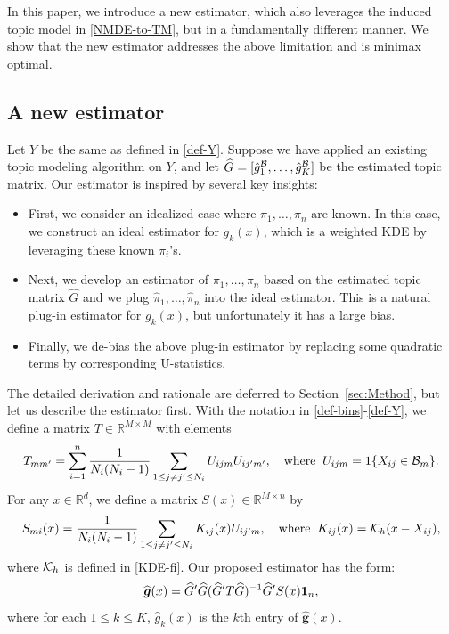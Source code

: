 \documentclass[preprint,11pt]{article}
\numberwithin{equation}{section}
\newcommand{\beq}{\begin{equation}}
\newcommand{\eeq}{\end{equation}}
\begin{document}
In this paper, we introduce a new estimator, which also leverages the induced topic model in \eqref{NMDE-to-TM}, but in a fundamentally different manner. We show that the new estimator addresses the above limitation and is minimax optimal. 



\subsection{A new estimator} \label{subsec:our-method}
Let $Y$ be the same as defined in \eqref{def-Y}. Suppose we have applied an existing topic modeling algorithm on $Y$, and let $\widehat{G}=[\hat{g}_1^{\cal B}, \ldots, \hat{g}_K^{\cal B}]$ be the estimated topic matrix. 
Our estimator is inspired by several key insights:
\begin{itemize}
	\item First, we consider an idealized case where $\pi_1, \ldots, \pi_n$ are known. In this case, we construct an ideal estimator for $g_k(x)$, which is a weighted KDE by leveraging these known $\pi_i$'s.
	\item Next, we develop an estimator of $\pi_1, \ldots, \pi_n$ based on %
	the estimated topic matrix $\widehat{G}$ and  we plug $\hat{\pi}_1, \ldots, \hat{\pi}_n$ into the ideal estimator. This is a natural plug-in estimator for $g_k(x)$, but unfortunately it has a large bias. 
	\item Finally, we de-bias the above plug-in estimator by replacing some quadratic terms by corresponding U-statistics. %
\end{itemize}
The detailed derivation and rationale are deferred to Section~\ref{sec:Method}, but let us describe the estimator first.
With the notation in \eqref{def-bins}-\eqref{def-Y},  we define a matrix $T\in\mathbb{R}^{M\times M}$ with elements
\beq \label{def-T-U}
T_{mm'} =  \sum_{i=1}^n \frac{1}{N_i(N_i-1)}  \sum_{1\leq j\neq j'\leq N_i} U_{ijm}U_{ij'm'}, \quad \mbox{where}\;\; U_{ijm}=1\{X_{ij}\in {\cal B}_m\}. 
\eeq
For any $x\in\mathbb{R}^d$, we define a matrix $S(x)\in\mathbb{R}^{M\times n}$ by 
\beq \label{def-S-K}
S_{mi}(x) = \frac{1}{N_i(N_i-1)}\sum_{1\leq j\neq j'\leq N_i} K_{ij}(x) U_{ij'm}, \quad\mbox{where}\;\;  K_{ij}(x) = {\cal K}_h(x-X_{ij}),
\eeq
where ${\cal K}_h$ is defined in \eqref{KDE-fi}.
Our proposed estimator has the form: 
\beq \label{our-estimator}
\widehat{\boldsymbol g}(x) = \widehat{G}'\widehat{G}(\widehat{G}'T\widehat{G})^{-1}\widehat{G}'S(x){\bf 1}_n,  
\eeq
where for each $1\leq k\leq K$, $\hat{g}_k(x)$ is the $k$th entry of $\widehat{\boldsymbol g}(x)$. 
\end{document}

